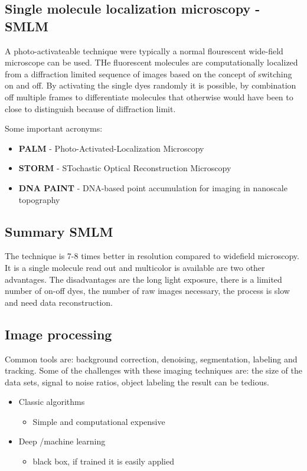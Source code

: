 	\subsection*{Single molecule localization microscopy - SMLM}
	A photo-activateable technique were typically a normal flourescent wide-field microscope can be used. THe fluorescent molecules are computationally localized from a diffraction limited sequence of images based on the concept of switching on and off. By activating the single dyes randomly it is possible, by combination off multiple frames to differentiate molecules that otherwise would have been to close to distinguish because of diffraction limit. 

	Some important acronyms:
	\begin{itemize}
	 	\item \textbf{PALM} - Photo-Activated-Localization Microscopy
	 	\item \textbf{STORM} - STochastic Optical Reconstruction Microscopy
	 	\item \textbf{DNA PAINT} - DNA-based point accumulation for imaging in nanoscale topography
	 \end{itemize} 
	
	\subsection*{Summary SMLM}
	The technique is 7-8 times better in resolution compared to widefield microscopy. It is a single molecule read out and multicolor is available are two other advantages. The disadvantages are the long light exposure, there is a limited number of on-off dyes, the number of raw images necessary, the process is slow and need data reconstruction. 


	\subsection*{Image processing}
	Common tools are: background correction, denoising, segmentation, labeling and tracking. Some of the challenges with these imaging techniques are: the size of the data sets, signal to noise ratios, object labeling the result can be tedious.

	\begin{itemize}
		\item Classic algorithms
		\begin{itemize}
			\item Simple and computational expensive
		\end{itemize}
		\item Deep /machine learning
		\begin{itemize}
			\item black box, if trained it is easily applied
		\end{itemize}
	\end{itemize}

